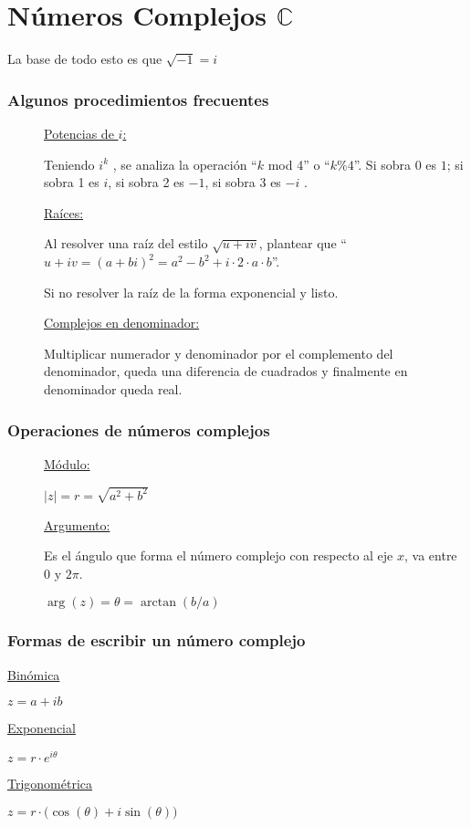 \section{
\texorpdfstring{Números Complejos $\mathbb{C}$}
{Números Complejos}
}

La base de todo esto es que $\sqrt{-1}=i$

\subsubsection*{Algunos procedimientos frecuentes}

\begin{description}

\item[]\underline{Potencias de $i$:}\hfil

Teniendo $i^k$ , se analiza la operación ``$k$ mod 4'' o ``$k\%4$''. Si sobra 0 es $1$; si sobra 1 es $i$, si sobra 2 es $-1$, si sobra 3 es $-i$ .

\item[]\underline{Raíces:}\hfil

    Al resolver una raíz del estilo $\sqrt{u+iv}$, plantear que ``$u + iv = (a+bi)^2 = a^2 - b^2 + i \cdot 2 \cdot a \cdot b $''.

    Si no resolver la raíz de la forma exponencial y listo.

\item[]\underline{Complejos en denominador:}\hfil

    Multiplicar numerador y denominador por el complemento del denominador, queda una diferencia de cuadrados y finalmente en denominador queda real.
\end{description}


\subsubsection*{Operaciones de números complejos}

\begin{description}
\item[]\underline{Módulo:}\hfil

\hfil$|z|=r=\sqrt{a^2+b^2}$\hfil

\item[]\underline{Argumento:}\hfil

Es el ángulo que forma el número complejo con respecto al eje $x$, va entre $0$ y $2\pi$.

\hfil$\arg (z) = \theta = \arctan(b/a)$\hfil

\end{description}


\subsubsection*{Formas de escribir un número complejo}

\begin{multicols}{3}
\centering

\underline{Binómica}

$z=a+ib$

\underline{Exponencial}

$z=r\cdot e^{i\theta}$

\underline{Trigonométrica}

$z=r \cdot \big(\cos \left(\theta\right) + i\sin\left(\theta\right)\big)$

\end{multicols}
